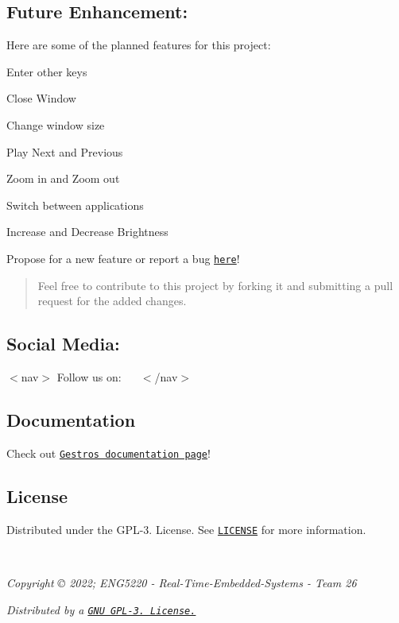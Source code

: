 \subsection*{Future Enhancement\+:}

Here are some of the planned features for this project\+:
\begin{DoxyItemize}
\item Enter other keys
\item Close Window
\item Change window size
\item Play Next and Previous
\item Zoom in and Zoom out
\item Switch between applications
\item Increase and Decrease Brightness
\end{DoxyItemize}

Propose for a new feature or report a bug \href{https://github.com/RandomGuy-coder/Gestro/issues}{\tt here}!

\begin{quote}
Feel free to contribute to this project by forking it and submitting a pull request for the added changes. \end{quote}


\subsection*{Social Media\+:}

$<$nav$>$ Follow us on\+:~\newline
~\newline
  \href{https://www.facebook.com/GestroProject}{\tt } \href{https://twitter.com/GestroProject}{\tt } \href{https://www.instagram.com/gestroproject/}{\tt } \href{https://hackaday.io/project/184728-gestro}{\tt }  $<$/nav$>$

\subsection*{Documentation}

Check out \href{https://randomguy-coder.github.io/Gestro/docs/html/index.html}{\tt Gestro\textquotesingle{}s documentation page}!

\subsection*{License}

Distributed under the G\+P\+L-\/3. License. See \href{https://github.com/RandomGuy-coder/Gestro/blob/main/LICENSE}{\tt {\ttfamily L\+I\+C\+E\+N\+SE}} for more information.

~\newline
 
\footnotesize {\itshape Copyright \copyright{} 2022; E\+N\+G5220 -\/ Real-\/\+Time-\/\+Embedded-\/\+Systems -\/ Team 26}
\normalsize ~\newline
 
\footnotesize {\itshape Distributed by a \href{https://github.com/RandomGuy-coder/Gestro/blob/main/LICENSE}{\tt G\+NU G\+P\+L-\/3. License.} }
\normalsize 